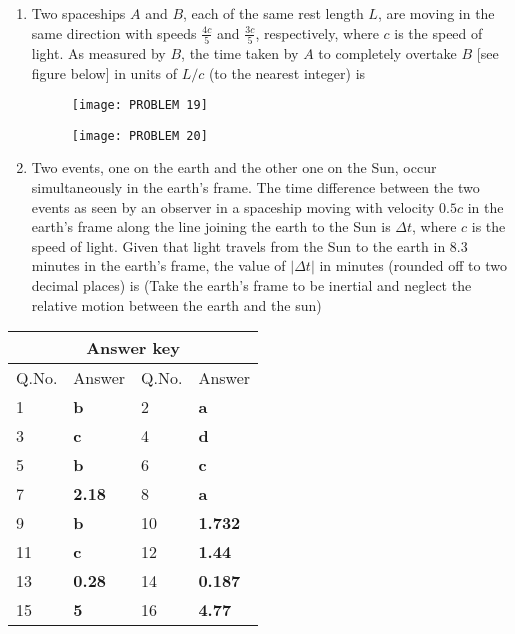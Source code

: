 \begin{enumerate}
	\item Two spaceships $A$ and $B$, each of the same rest length $L$, are moving in the same direction with speeds $\frac{4 c}{5}$ and $\frac{3 c}{5}$, respectively, where $c$ is the speed of light. As measured by $B$, the time taken by $A$ to completely overtake $B$ [see figure below] in units of $L / c$ (to the nearest integer) is
	{}$\left. \right. $\\
	\begin{minipage}{0.5\textwidth}
		\begin{figure}[H]
			\centering
			\texttt{[image: PROBLEM 19]}
		\end{figure}	
	\end{minipage}
	\begin{minipage}{0.5\textwidth}
		\begin{figure}[H]
			\centering
			\texttt{[image: PROBLEM 20]}
		\end{figure}
	\end{minipage}
	\item Two events, one on the earth and the other one on the Sun, occur simultaneously in the earth's frame. The time difference between the two events as seen by an observer in a spaceship moving with velocity $0.5 c$ in the earth's frame along the line joining the earth to the Sun is $\Delta t$, where $c$ is the speed of light. Given that light travels from the Sun to the earth in $8.3$ minutes in the earth's frame, the value of $|\Delta t|$ in minutes (rounded off to two decimal places) is
	(Take the earth's frame to be inertial and neglect the relative motion between the earth and the sun)
{	}
\end{enumerate}
\setlength\arrayrulewidth{1pt}
\begin{table}[H]
	\centering
	
	\begin{tabular}{|p{1.5cm}|p{1.5cm}||p{1.5cm}|p{1.5cm}|}
		\hline
		\multicolumn{4}{|c|}{\textbf{Answer key}}\\\hline\hline
		\rowcolor{ocrel}Q.No.&Answer&Q.No.&Answer\\\hline
		1&\textbf{b}&2&\textbf{a}\\\hline
		3&\textbf{c}&4&\textbf{d}\\\hline
		5&\textbf{b}&6&\textbf{c}\\\hline
		7&\textbf{2.18}&8&\textbf{a}\\\hline
		9&\textbf{b}&10&\textbf{1.732}\\\hline
		11&\textbf{c}&12&\textbf{1.44}\\\hline
		13&\textbf{0.28}&14&\textbf{0.187}\\\hline
		15&\textbf{5}&16&\textbf{4.77}\\\hline
	\end{tabular}
\end{table}

